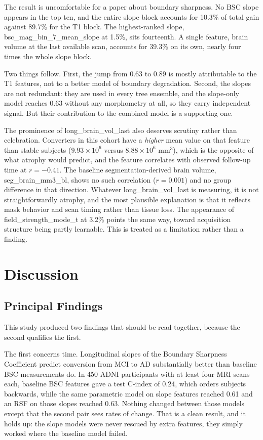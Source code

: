 \documentclass[blue]{ludusofficial}  %
\begin{document}
The result is uncomfortable for a paper about boundary sharpness. No BSC slope appears in the top ten, and the entire slope block accounts for 10.3\% of total gain against 89.7\% for the T1 block. The highest-ranked slope, bsc\_mag\_bin\_7\_mean\_slope at 1.5\%, sits fourteenth. A single feature, brain volume at the last available scan, accounts for 39.3\% on its own, nearly four times the whole slope block.

Two things follow. First, the jump from 0.63 to 0.89 is mostly attributable to the T1 features, not to a better model of boundary degradation. Second, the slopes are not redundant: they are used in every tree ensemble, and the slope-only model reaches 0.63 without any morphometry at all, so they carry independent signal. But their contribution to the combined model is a supporting one.

The prominence of long\_brain\_vol\_last also deserves scrutiny rather than celebration. Converters in this cohort have a \textit{higher} mean value on that feature than stable subjects ($9.93 \times 10^6$ versus $8.88 \times 10^6$ mm$^3$), which is the opposite of what atrophy would predict, and the feature correlates with observed follow-up time at $r = -0.41$. The baseline segmentation-derived brain volume, seg\_brain\_mm3\_bl, shows no such correlation ($r = 0.001$) and no group difference in that direction. Whatever long\_brain\_vol\_last is measuring, it is not straightforwardly atrophy, and the most plausible explanation is that it reflects mask behavior and scan timing rather than tissue loss. The appearance of field\_strength\_mode\_t at 3.2\% points the same way, toward acquisition structure being partly learnable. This is treated as a limitation rather than a finding.

\section{Discussion}

\subsection{Principal Findings}

This study produced two findings that should be read together, because the second qualifies the first.

The first concerns time. Longitudinal slopes of the Boundary Sharpness Coefficient predict conversion from MCI to AD substantially better than baseline BSC measurements do. In 450 ADNI participants with at least four MRI scans each, baseline BSC features gave a test C-index of 0.24, which orders subjects backwards, while the same parametric model on slope features reached 0.61 and an RSF on those slopes reached 0.63. Nothing changed between those models except that the second pair sees rates of change. That is a clean result, and it holds up: the slope models were never rescued by extra features, they simply worked where the baseline model failed.
\end{document}

